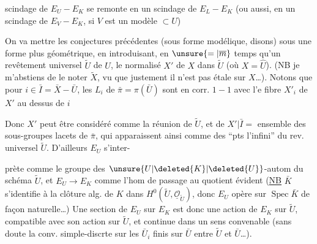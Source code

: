 scindage de $E_U-E_K$ se  remonte en un scindage de $E_L-E_K$ (ou aussi,  en un scindage de $E_V-E_K$, si $V$ est un modèle $\subset U$)

On va mettre les conjectures précédentes (sous forme modélique, disons) sous une forme plus géométrique, en introduisant, en $\unsure{=|\overline m}$ temps qu'un revêtement universel  $\widetilde U$ de $U$, le normalisé  $X'$ de $X$ dans $\widetilde U$ (où $X=\widehat U$). (NB je m'abstiens de le noter $\widetilde X$, vu que justement il n'est pas étale sur $X$\ldots). Notons que pour $i\in\bar I=\bar X-\bar U$, les  $L_i$ de $\bar\pi=\pi(\bar U)$ sont en corr. $1-1$ avec l'e fibre $X'_i$ de $X'$ au dessus de $i$


Donc $X'$ peut être considéré comme la réunion de $\widetilde U$, et de $X'|\bar I=$ ensemble des sous-groupes lacets de $\bar\pi$, qui apparaissent ainsi comme des ``pts  l'infini'' du rev. universel $\widetilde U$. D'ailleurs $E_U$ s'inter-

prète comme le groupe  des $\unsure{U|\deleted{K}|\deleted{U}}$-autom du schéma $\widetilde U$, et $E_U\longrightarrow E_K$ comme l'hom de passage au quotient évident (\uline{NB} $\bar K$ s'identifie à la clôture alg. de $K$ dans $H^0(\widetilde U,\underline{\mathcal O}_{\widetilde U})$, donc $E_U$ opère sur $\operatorname{Spec}\bar K$ de façon naturelle\ldots) Une section de $E_U$ sur $E_K$ est donc une action de $E_K$ sur $\widetilde U$, compatible avec son action sur $\widetilde U$, et continue dans un sens convenable (sans doute la conv. simple-discrte sur les  $\bar U_i$ finis sur $\bar U$ entre $\widetilde U$ et $\bar U$\ldots).


